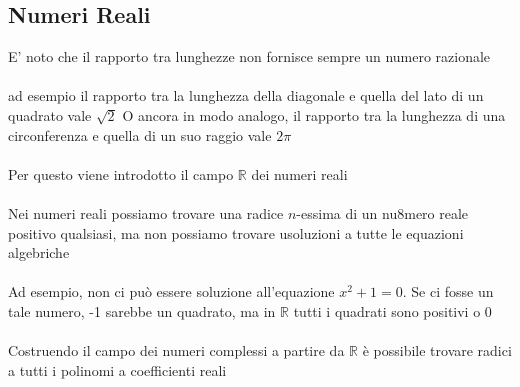 \documentclass{report}
\begin{document}
\subsection{Numeri Reali}
E' noto che il rapporto tra lunghezze non fornisce sempre un numero razionale
\\ \\
ad esempio il rapporto tra la lunghezza della diagonale e quella del lato di un quadrato vale $\sqrt{2}$ O ancora in modo analogo, il rapporto tra la lunghezza di una circonferenza e quella di un suo raggio vale $2\pi$
\\ \\
Per questo viene introdotto il campo $\mathbb{R}$ dei numeri reali
\\ \\
Nei numeri reali possiamo trovare una radice $n$-essima di un nu8mero reale positivo qualsiasi, ma non possiamo trovare usoluzioni a tutte le equazioni algebriche
\\ \\
Ad esempio, non ci può essere soluzione all'equazione $x^2 + 1 = 0$. Se ci fosse un tale numero, -1 sarebbe un quadrato, ma in $\mathbb{R}$ tutti i quadrati sono positivi o $0$
\\ \\
Costruendo il campo dei numeri complessi a partire da $\mathbb{R}$ è possibile trovare radici a tutti i polinomi a coefficienti reali
\end{document}

